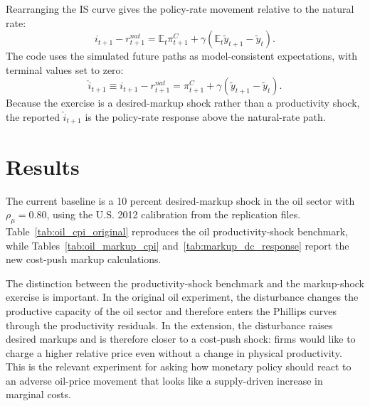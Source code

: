 \documentclass[12pt]{article}
\newcommand{\E}{\mathbb{E}}
\newcommand{\ytilde}{\tilde y}
\begin{document}
Rearranging the IS curve gives the policy-rate movement relative to the natural rate:
\begin{equation}
    i_{t+1}-r^{nat}_{t+1}
    =
    \E_t\pi^C_{t+1}
    +
    \gamma
    \left(
        \E_t\ytilde_{t+1}-\ytilde_t
    \right).
    \label{eq:rate-gap}
\end{equation}
The code uses the simulated future paths as model-consistent expectations, with
terminal values set to zero:
\begin{equation}
    \widehat i_{t+1}
    \equiv
    i_{t+1}-r^{nat}_{t+1}
    =
    \pi^C_{t+1}
    +
    \gamma
    \left(
        \ytilde_{t+1}-\ytilde_t
    \right).
    \label{eq:rate-implemented}
\end{equation}
Because the exercise is a desired-markup shock rather than a productivity shock, the
reported $\widehat i_{t+1}$ is the policy-rate response above the natural-rate path.

\section{Results}
\label{sec:results}

The current baseline is a 10 percent desired-markup shock in the oil sector with
$\rho_\mu=0.80$, using the U.S. 2012 calibration from the replication files.
Table~\ref{tab:oil_cpi_original} reproduces the oil productivity-shock benchmark,
while Tables~\ref{tab:oil_markup_cpi} and~\ref{tab:markup_dc_response} report the new
cost-push markup calculations.

The distinction between the productivity-shock benchmark and the markup-shock exercise
is important. In the original oil experiment, the disturbance changes the productive
capacity of the oil sector and therefore enters the Phillips curves through the
productivity residuals. In the extension, the disturbance raises desired markups and is
therefore closer to a cost-push shock: firms would like to charge a higher relative
price even without a change in physical productivity. This is the relevant experiment
for asking how monetary policy should react to an adverse oil-price movement that looks
like a supply-driven increase in marginal costs.
\end{document}
